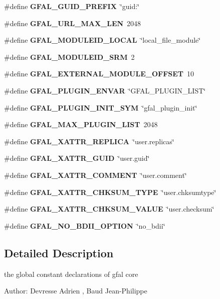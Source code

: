 \begin{CompactItemize}
\item 
\#define \textbf{GFAL\_\-GUID\_\-PREFIX}~\char`\"{}guid:\char`\"{}\label{gfal__constants_8h_9adb5dc8efeaa3454b32e2f67309e36f}

\item 
\#define \textbf{GFAL\_\-URL\_\-MAX\_\-LEN}~2048\label{gfal__constants_8h_8aeca034bb7345f07b3b736501168cdd}

\item 
\#define \textbf{GFAL\_\-MODULEID\_\-LOCAL}~\char`\"{}local\_\-file\_\-module\char`\"{}\label{gfal__constants_8h_6843a99bf27c1e7f0ea245ba0a4b4638}

\item 
\#define \textbf{GFAL\_\-MODULEID\_\-SRM}~2\label{gfal__constants_8h_81086ad079cc0d38b02e33018b11cb78}

\item 
\#define \textbf{GFAL\_\-EXTERNAL\_\-MODULE\_\-OFFSET}~10\label{gfal__constants_8h_c3acf68b834fb0400f412735badbe8bb}

\item 
\#define \textbf{GFAL\_\-PLUGIN\_\-ENVAR}~\char`\"{}GFAL\_\-PLUGIN\_\-LIST\char`\"{}\label{gfal__constants_8h_c414ec8b2ed505d8318b1102ea3dd987}

\item 
\#define \textbf{GFAL\_\-PLUGIN\_\-INIT\_\-SYM}~\char`\"{}gfal\_\-plugin\_\-init\char`\"{}\label{gfal__constants_8h_6549284d505729b12a761cbb6c3914f5}

\item 
\#define \textbf{GFAL\_\-MAX\_\-PLUGIN\_\-LIST}~2048\label{gfal__constants_8h_8b50ed92a1ea58484de650f667db28f1}

\item 
\#define \textbf{GFAL\_\-XATTR\_\-REPLICA}~\char`\"{}user.replicas\char`\"{}\label{gfal__constants_8h_99cf748c03f297ef6e429cbd2dfe3c35}

\item 
\#define \textbf{GFAL\_\-XATTR\_\-GUID}~\char`\"{}user.guid\char`\"{}\label{gfal__constants_8h_a395dff27be0cd2e43081098f5c68833}

\item 
\#define \textbf{GFAL\_\-XATTR\_\-COMMENT}~\char`\"{}user.comment\char`\"{}\label{gfal__constants_8h_43f447aa0c1b5fe95a4c79b23c770952}

\item 
\#define \textbf{GFAL\_\-XATTR\_\-CHKSUM\_\-TYPE}~\char`\"{}user.chksumtype\char`\"{}\label{gfal__constants_8h_fc6ffd43ad73ab219155b61c02405aec}

\item 
\#define \textbf{GFAL\_\-XATTR\_\-CHKSUM\_\-VALUE}~\char`\"{}user.checksum\char`\"{}\label{gfal__constants_8h_2e084155870841ad60f7353089f3bdf4}

\item 
\#define \textbf{GFAL\_\-NO\_\-BDII\_\-OPTION}~\char`\"{}no\_\-bdii\char`\"{}\label{gfal__constants_8h_992716aa0db1782d63f1fa57fd7f7d19}

\end{CompactItemize}


\subsection{Detailed Description}
the global constant declarations of gfal core \begin{Desc}
\item[Author:]Devresse Adrien , Baud Jean-Philippe \end{Desc}

